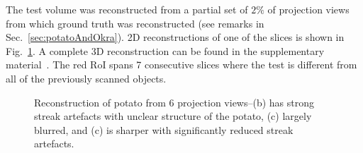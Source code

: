 \documentclass[journal]{IEEEtran}
\begin{document}
The test volume was reconstructed from a partial set of $2\%$ of projection views from
which ground truth was reconstructed (see remarks in
Sec.~\ref{sec:potatoAndOkra}). 2D reconstructions of one of the slices
is shown in Fig.~\ref{fig:potato_2D_results}. A complete 3D
reconstruction can be found in the supplementary
material~\cite{supp_paper}. The red RoI spans 7 consecutive slices
where the test is different from all of the previously scanned
objects. %
\begin{figure}[!h]
\centering
{}
\caption{Reconstruction of potato from 6 projection views--(b) has strong streak artefacts with unclear structure of the potato, (c) largely blurred, and (c) is sharper with significantly reduced streak artefacts.}
\label{fig:potato_2D_results}
\end{figure}
\end{document}
